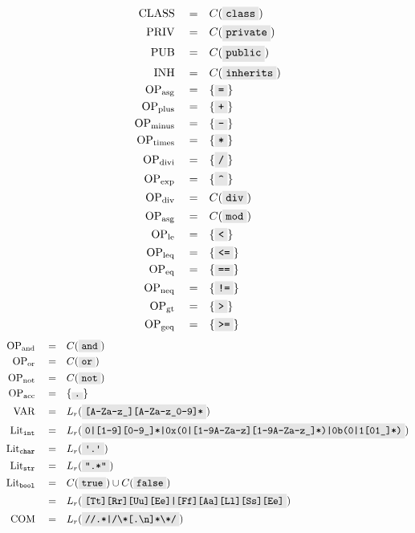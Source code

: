 \documentclass{article}
\newcommand{\code}[1]{\colorbox{gray!20}{\texttt{#1}}}
\begin{document}
\begin{multicols}{2}
\begin{align}
    \mathrm{CLASS}\quad =&\quad C( \code{class} ) \\
    \mathrm{PRIV}\quad =&\quad C( \code{private} ) \\
    \mathrm{PUB}\quad =&\quad C( \code{public} ) \\
    \mathrm{INH}\quad =&\quad C( \code{inherits} ) \\
    \mathrm{OP}_\mathrm{asg}\quad =&\quad \{\code=\} \\
    \mathrm{OP}_\mathrm{plus}\quad =&\quad \{\code+\} \\
    \mathrm{OP}_\mathrm{minus}\quad =&\quad \{\code-\} \\
    \mathrm{OP}_\mathrm{times}\quad =&\quad \{\code*\} \\
    \mathrm{OP}_\mathrm{divi}\quad =&\quad \{\code/\} \\
    \mathrm{OP}_\mathrm{exp}\quad =&\quad \{\code\textasciicircum\} \\
    \mathrm{OP}_\mathrm{div}\quad =&\quad C(\code{div}) \\
    \mathrm{OP}_\mathrm{asg}\quad =&\quad C(\code{mod}) \\
    \mathrm{OP}_\mathrm{le}\quad =&\quad \{\code{<}\} \\
    \mathrm{OP}_\mathrm{leq}\quad =&\quad \{\code{<=}\} \\
    \mathrm{OP}_\mathrm{eq}\quad =&\quad \{\code{==}\} \\
    \mathrm{OP}_\mathrm{neq}\quad =&\quad \{\code{!=}\} \\
    \mathrm{OP}_\mathrm{gt}\quad =&\quad \{\code>\} \\
    \mathrm{OP}_\mathrm{geq}\quad =&\quad \{\code{>=}\}
\end{align}
\begin{align}
    \mathrm{OP}_\mathrm{and}\quad =&\quad C(\code{and}) \\
    \mathrm{OP}_\mathrm{or}\quad =&\quad C(\code{or}) \\
    \mathrm{OP}_\mathrm{not}\quad =&\quad C(\code{not}) \\
    \mathrm{OP}_\mathrm{acc}\quad =&\quad \{\code.\} \\
    \mathrm{VAR}\quad =& \quad L_r(\code{[A-Za-z\_][A-Za-z\_0-9]*} ) \\
    \mathrm{Lit}_{\mathtt{int}} \quad=&\quad L_r(\code{0|[1-9][0-9\_]*|0x(0|[1-9A-Za-z][1-9A-Za-z\_]*)|0b(0|1[01\_]*)}) \\
    \mathrm{Lit}_{\mathtt{char}}\quad =&\quad L_r( \code{\textquotesingle.\textquotesingle}) \\
    \mathrm{Lit}_{\mathtt{str}}\quad =&\quad L_r( \code{".*"}) \\
    \mathrm{Lit}_{\mathtt{bool}} \quad =&\quad C(\code{true}) \cup C(\code{false})  \\
    =& \quad L_r(\code{[Tt][Rr][Uu][Ee]|[Ff][Aa][Ll][Ss][Ee]}) \nonumber \\
    \mathrm{COM} \quad =&\quad L_r(\code{//.*|/\textbackslash*[.\textbackslash n]*\textbackslash*/})
\end{align}
\end{multicols}
\end{document}
